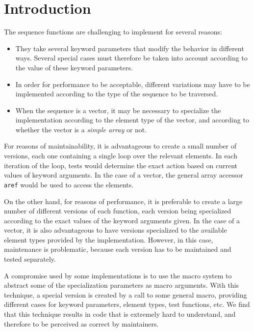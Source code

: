 \section{Introduction}

The \commonlisp{} \cite{ansi:common:lisp} sequence functions are
challenging to implement for several reasons:

\begin{itemize}
\item They take several keyword parameters that modify the behavior in
  different ways.  Several special cases must therefore be taken into
  account according to the value of these keyword parameters.
\item In order for performance to be acceptable, different variations
  may have to be implemented according to the type of the sequence to
  be traversed.
\item When the sequence is a vector, it may be necessary to specialize
  the implementation according to the element type of the vector, and
  according to whether the vector is a \emph{simple array} or not.
\end{itemize}

For reasons of maintainability, it is advantageous to create a small
number of versions, each one containing a single loop over the
relevant elements.  In each iteration of the loop, tests would
determine the exact action based on current values of keyword
arguments.  In the case of a vector, the general array accessor
\texttt{aref} would be used to access the elements.

On the other hand, for reasons of performance, it is preferable to
create a large number of different versions of each function, each
version being specialized according to the exact values of the keyword
arguments given.  In the case of a vector, it is also advantageous to
have versions specialized to the available element types provided by
the implementation.  However, in this case, maintenance is
problematic, because each version has to be maintained and tested
separately.

A compromise used by some implementations is to use the \commonlisp{}
macro system to abstract some of the specialization parameters as
macro arguments.  With this technique, a special version is created by
a call to some general macro, providing different cases for keyword
parameters, element types, test functions, etc.  We find that this
technique results in code that is extremely hard to understand, and
therefore to be perceived as correct by maintainers.

